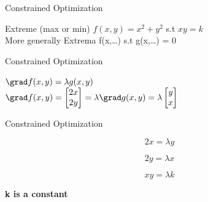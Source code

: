\documentclass{beamer}
\begin{document}
    
    
    


\begin{frame}{Constrained Optimization}
    
    Extreme (max or min) $f(x,y) = x^{2}+y^{2}$ s.t $xy=k$\\
    
    \vspace{5em}
    More generally Extrema f(x,\dots) s.t g(x,\dots) = 0
    
\end{frame}

\begin{frame}{Constrained Optimization}
    
    $\grad f(x,y) = \lambda g(x,y)$\\
    $\grad f(x,y) = \begin{bmatrix}
    2x\\
    2y
    \end{bmatrix}
    = \lambda \grad g(x,y)  = \lambda \begin{bmatrix}
    y\\
    x\\
    \end{bmatrix}$
\end{frame}

\begin{frame}{Constrained Optimization}
    
    \begin{equation}
            2x = \lambda y
    \end{equation}
    
    
    \begin{equation}
            2y = \lambda x
    \end{equation}
    
    
    \begin{equation}
            xy = \lambda k
    \end{equation}
    
    \textbf{k is a constant}
\end{frame}
\end{document}

